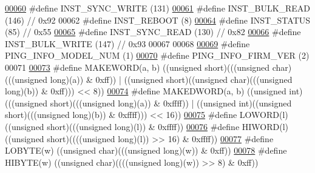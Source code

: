 \begin{DoxyCode}
\hypertarget{dynamixel_8h_source_l00060}{}\hyperlink{dynamixel_8h_aeaa4b61ee11d45bd1a0cb932d7abaf77}{00060} \textcolor{preprocessor}{#define INST\_SYNC\_WRITE     (131)}
\hypertarget{dynamixel_8h_source_l00061}{}\hyperlink{dynamixel_8h_a7967a17d10e9100ffb48ca542ba7587f}{00061} \textcolor{preprocessor}{#define INST\_BULK\_READ      (146)  // 0x92}
00062 \textcolor{preprocessor}{#define INST\_REBOOT         (8)}
\hypertarget{dynamixel_8h_source_l00064}{}\hyperlink{dynamixel_8h_ad64f9506dd447c94c75405ecae867b87}{00064} \textcolor{preprocessor}{#define INST\_STATUS         (85)   // 0x55}
\hypertarget{dynamixel_8h_source_l00065}{}\hyperlink{dynamixel_8h_a2c0994e6f77bcf585d7dfde88c10441f}{00065} \textcolor{preprocessor}{#define INST\_SYNC\_READ      (130)  // 0x82}
\hypertarget{dynamixel_8h_source_l00066}{}\hyperlink{dynamixel_8h_a54f0a35d92b5238ca86cf770198cc1bf}{00066} \textcolor{preprocessor}{#define INST\_BULK\_WRITE     (147)  // 0x93}
00067 
00068 
\hypertarget{dynamixel_8h_source_l00069}{}\hyperlink{dynamixel_8h_addfe8da7a67888c0c7718cdd2f2ddfd4}{00069} \textcolor{preprocessor}{#define PING\_INFO\_MODEL\_NUM   (1)}
\hypertarget{dynamixel_8h_source_l00070}{}\hyperlink{dynamixel_8h_a2567de0a1d75cc4dfd4b0cf1abf425c9}{00070} \textcolor{preprocessor}{#define PING\_INFO\_FIRM\_VER    (2)}
00071     
\hypertarget{dynamixel_8h_source_l00073}{}\hyperlink{dynamixel_8h_a6b98c16b8e3e7733dd4063d0b0fac24c}{00073} \textcolor{preprocessor}{#define MAKEWORD(a, b)      ((unsigned short)(((unsigned char)(((unsigned long)(a)) & 0xff)) | ((unsigned
       short)((unsigned char)(((unsigned long)(b)) & 0xff))) << 8))}
\hypertarget{dynamixel_8h_source_l00074}{}\hyperlink{dynamixel_8h_a84e53a3db3f2ef95c6085d6f3531ae0e}{00074} \textcolor{preprocessor}{#define MAKEDWORD(a, b)     ((unsigned int)(((unsigned short)(((unsigned long)(a)) & 0xffff)) | ((unsigned
       int)((unsigned short)(((unsigned long)(b)) & 0xffff))) << 16))}
\hypertarget{dynamixel_8h_source_l00075}{}\hyperlink{dynamixel_8h_a00be6c40bc7a1297ada4d47a028066b8}{00075} \textcolor{preprocessor}{#define LOWORD(l)           ((unsigned short)(((unsigned long)(l)) & 0xffff))}
\hypertarget{dynamixel_8h_source_l00076}{}\hyperlink{dynamixel_8h_aeb28b2d61bd674900a89bfb77e28ae07}{00076} \textcolor{preprocessor}{#define HIWORD(l)           ((unsigned short)((((unsigned long)(l)) >> 16) & 0xffff))}
\hypertarget{dynamixel_8h_source_l00077}{}\hyperlink{dynamixel_8h_a04c0416272e5c07bdf955d803a21688e}{00077} \textcolor{preprocessor}{#define LOBYTE(w)           ((unsigned char)(((unsigned long)(w)) & 0xff))}
\hypertarget{dynamixel_8h_source_l00078}{}\hyperlink{dynamixel_8h_a75c5b5f21e837e80c0feb4da9a421f87}{00078} \textcolor{preprocessor}{#define HIBYTE(w)           ((unsigned char)((((unsigned long)(w)) >> 8) & 0xff))}

\end{DoxyCode}
